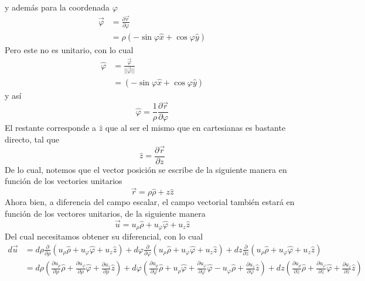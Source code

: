 \documentclass[11pt,letterpaper]{article}
\begin{document}
y además para la coordenada $\varphi$
\begin{align*}
    \vec{\varphi}&=\frac{\partial \vec{r}}{\partial \varphi} \\
    & = \rho (-\sin{\varphi}\hat{x} + \cos{\varphi}\hat{y})
\end{align*}
Pero este no es unitario, con lo cual
\begin{align*}
    \hat{\varphi} & =\frac{\vec{\varphi}}{||\vec{\varphi}||} \\
    & = (-\sin{\varphi}\hat{x} + \cos{\varphi}\hat{y})
\end{align*}
y así
\begin{equation}
    \hat{\varphi}=\frac{1}{\rho}\frac{\partial \vec{r}}{\partial \varphi}
\end{equation}
El restante corresponde a $\hat{z}$ que al ser el mismo que en cartesianas es bastante directo, tal que
\begin{equation}
    \hat{z}=\frac{\partial \vec{r}}{\partial z}
\end{equation}
De lo cual, notemos que el vector posición se escribe de la siguiente manera en función de los vectories unitarios
\begin{equation}
    \vec{r}=\rho\hat{\rho}+z\hat{z}
\end{equation}
Ahora bien, a diferencia del campo escalar, el campo vectorial también estará en función de los vectores unitarios, de la siguiente manera
\begin{equation}
    \vec{u}=u_{\rho}\hat{\rho}+u_{\varphi}\hat{\varphi}+u_z\hat{z}
\end{equation}
Del cual necesitamos obtener su diferencial, con lo cual
\begin{align*}
    d\vec{u} & =d\rho \frac{\partial }{\partial \rho}(u_{\rho}\hat{\rho}+u_{\varphi}\hat{\varphi}+u_z\hat{z}) + d\varphi \frac{\partial}{\partial \varphi} (u_{\rho}\hat{\rho}+u_{\varphi}\hat{\varphi}+u_z\hat{z}) + dz\frac{\partial}{\partial z}(u_{\rho}\hat{\rho}+u_{\varphi}\hat{\varphi}+u_z\hat{z}) \\
    & = d\rho (\frac{\partial u_{\rho}}{\partial \rho}\hat{\rho} + \frac{\partial u_{\varphi}}{\partial \rho}\hat{\varphi} + \frac{\partial u_{z}}{\partial \rho}\hat{z}) + d\varphi(\frac{\partial u_\rho}{\partial \varphi}\hat{\rho} + u_\rho \hat{\varphi} + \frac{\partial u_\varphi}{\partial \varphi}\hat{\varphi} - u_\varphi\hat{\rho} + \frac{\partial u_z}{\partial \varphi}\hat{z}) + dz(\frac{\partial u_\rho}{\partial z}\hat{\rho}+\frac{\partial u_\varphi}{\partial z}\hat{\varphi}+\frac{\partial u_z}{\partial z}\hat{z})
\end{align*}
\end{document}
